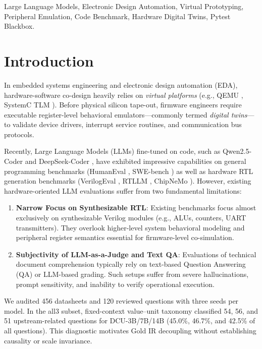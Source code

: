 \documentclass[conference]{IEEEtran}
\begin{document}
\begin{IEEEkeywords}
Large Language Models, Electronic Design Automation, Virtual Prototyping, Peripheral Emulation, Code Benchmark, Hardware Digital Twins, Pytest Blackbox.
\end{IEEEkeywords}

\section{Introduction}

In embedded systems engineering and electronic design automation (EDA), hardware-software co-design heavily relies on \textit{virtual platforms} (e.g., QEMU \cite{bellard2005qemu}, SystemC TLM \cite{ghenassia2005transaction}). Before physical silicon tape-out, firmware engineers require executable register-level behavioral emulators---commonly termed \textit{digital twins}---to validate device drivers, interrupt service routines, and communication bus protocols.

Recently, Large Language Models (LLMs) fine-tuned on code, such as Qwen2.5-Coder \cite{hui2024qwen25coder} and DeepSeek-Coder \cite{guo2024deepseekcoder}, have exhibited impressive capabilities on general programming benchmarks (HumanEval \cite{chen2021evaluating}, SWE-bench \cite{jimenez2024swebench}) as well as hardware RTL generation benchmarks (VerilogEval \cite{thakur2023verilogeval}, RTLLM \cite{lu2024rtllm}, ChipNeMo \cite{liu2023chipnemo}). However, existing hardware-oriented LLM evaluations suffer from two fundamental limitations:
\begin{enumerate}
    \item \textbf{Narrow Focus on Synthesizable RTL}: Existing benchmarks focus almost exclusively on synthesizable Verilog modules (e.g., ALUs, counters, UART transmitters). They overlook higher-level system behavioral modeling and peripheral register semantics essential for firmware-level co-simulation.
    \item \textbf{Subjectivity of LLM-as-a-Judge and Text QA}: Evaluations of technical document comprehension typically rely on text-based Question Answering (QA) or LLM-based grading. Such setups suffer from severe hallucinations, prompt sensitivity, and inability to verify operational execution.
\end{enumerate}

We audited 456 datasheets and 120 reviewed questions with three seeds per model. In the all3 subset, fixed-context value--unit taxonomy classified 54, 56, and 51 upstream-related questions for DCU-3B/7B/14B (45.0\%, 46.7\%, and 42.5\% of all questions). This diagnostic motivates Gold IR decoupling without establishing causality or scale invariance.
\end{document}
